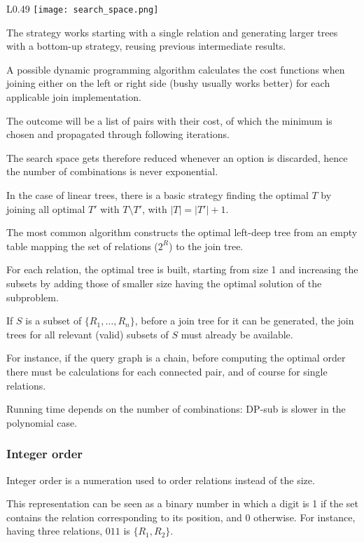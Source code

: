\begin{wrapfigure}{L}{0.49\textwidth}
	\vspace{-10pt}
	\texttt{[image: search\_space.png]}
	\vspace{-40pt}
\end{wrapfigure}

The strategy works starting with a single relation and generating larger trees with a bottom-up strategy, reusing previous intermediate results.

A possible dynamic programming algorithm calculates the cost functions when joining either on the left or right side (bushy usually works better) for each applicable join implementation. 

The outcome will be a list of pairs with their cost, of which the minimum is chosen and propagated through following iterations.

The search space gets therefore reduced whenever an option is discarded, hence the number of combinations is never exponential.

In the case of linear trees, there is a basic strategy finding the optimal $T$ by joining all optimal $T'$ with $T \setminus T'$, with $|T| = |T'| + 1$.

The most common algorithm constructs the optimal left-deep tree from an empty table mapping the set of relations ($2^R$) to the join tree. 

For each relation, the optimal tree is built, starting from size 1 and increasing the subsets by adding those of smaller size having the optimal solution of the subproblem.

If $S$ is a subset of $\{R_1, \dots, R_n\}$, before a join tree for it can be generated, the join trees for all relevant (valid) subsets of $S$ must already be available.

For instance, if the query graph is a chain, before computing the optimal order there must be calculations for each connected pair, and of course for single relations.

Running time depends on the number of combinations: DP-sub is slower in the polynomial case.

\subsubsection{Integer order}
Integer order is a numeration used to order relations instead of the size.

This representation can be seen as a binary number in which a digit is 1 if the set contains the relation corresponding to its position, and 0 otherwise. For instance, having three relations, $011$ is $\{R_1, R_2\}$.

